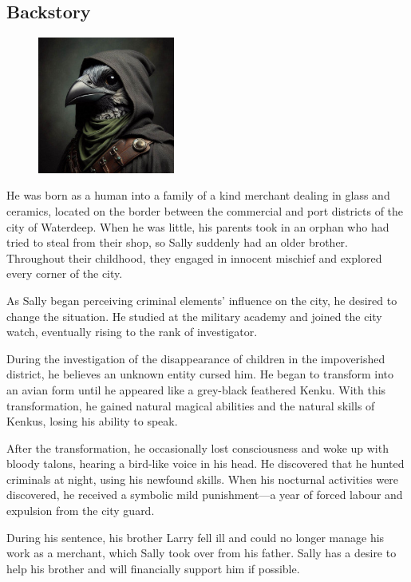 \documentclass[10pt,onecolumn,twoside,openany,bg=full,layout=true]{dndbook}
\begin{document}
  \subsection{Backstory}\label{subsec:sally-backstory}
  \begin{figure}
    \begin{center}
      \includegraphics[width=0.4\textwidth]{img/sally}
    \end{center}
  \end{figure}

He was born as a human into a family of a kind merchant dealing in glass and ceramics, located on the border between the
commercial and port districts of the city of Waterdeep.
When he was little, his parents took in an orphan who had tried to steal from their shop, so Sally suddenly had an
older brother.
Throughout their childhood, they engaged in innocent mischief and explored every corner of the city.

As Sally began perceiving criminal elements' influence on the city, he desired to change the situation.
He studied at the military academy and joined the city watch, eventually rising to the rank of investigator.

During the investigation of the disappearance of children in the impoverished district, he believes an unknown entity
cursed him.
He began to transform into an avian form until he appeared like a grey-black feathered Kenku.
With this transformation, he gained natural magical abilities and the natural skills of Kenkus, losing his ability
to speak.

After the transformation, he occasionally lost consciousness and woke up with bloody talons,
hearing a bird-like voice in his head.
He discovered that he hunted criminals at night, using his newfound skills.
When his nocturnal activities were discovered, he received a symbolic mild punishment—a year of forced labour and
expulsion from the city guard.

During his sentence, his brother Larry fell ill and could no longer manage his work as a merchant,
which Sally took over from his father.
Sally has a desire to help his brother and will financially support him if possible.
\end{document}
